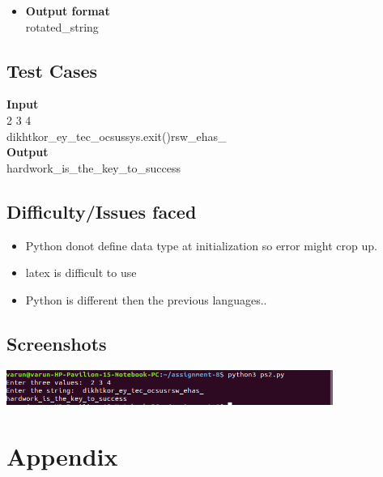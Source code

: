 \documentclass[12pt]{article}
\begin{document}
{{\begin{itemize}
\item \textbf{Output format} \\
rotated\_string\\
\end{itemize}
}


\subsection{Test Cases}
{
\textbf{Input}\\
2 3 4\\
dikhtkor\_ey\_tec\_ocsussys.exit()rsw\_ehas\_\\
\textbf{Output}\\
hardwork\_is\_the\_key\_to\_success\\

}
\subsection{Difficulty/Issues faced}
{
\begin{itemize}
\item Python donot define data type at initialization so error might crop up.
\item latex is difficult to use
\item Python is different then the previous languages..
\end{itemize}
}
\subsection{Screenshots}
\includegraphics[width=0.8\textwidth]{out2.png}
{
\begin{center}
    
\end{center}    
}
\newpage

\section{Appendix}

}
\end{document}
